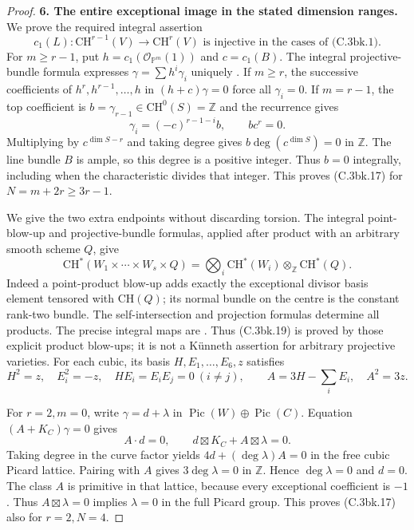 \begin{proof}
\textbf{6. The entire exceptional image in the stated dimension ranges.}
We prove the required integral assertion
\[
 c_1(L):\mathrm{CH}^{r-1}(V)\longrightarrow\mathrm{CH}^r(V)
       \text{ is injective in the cases of (C.3bk.1).}
 \tag{C.3bk.17}
\]
For $m\ge r-1$, put $h=c_1(\mathcal O_{\mathbb P^m}(1))$ and
$c=c_1(B)$. The integral projective-bundle formula expresses
$\gamma=\sum h^i\gamma_i$ uniquely
\citep[Lemma 42.36.2, Tag 02TX]{cyStacksProject}.
If $m\ge r$, the successive coefficients of $h^r,h^{r-1},\ldots,h$
in $(h+c)\gamma=0$ force all $\gamma_i=0$.
If $m=r-1$, the top coefficient is
$b=\gamma_{r-1}\in\mathrm{CH}^0(S)=\mathbb Z$ and the recurrence gives
\[
 \gamma_i=(-c)^{r-1-i}b,\qquad b c^r=0.
 \tag{C.3bk.18}
\]
Multiplying by $c^{\dim S-r}$ and taking degree gives
$b\deg(c^{\dim S})=0$ in $\mathbb Z$. The line bundle $B$ is ample,
so this degree is a positive integer. Thus $b=0$ integrally,
including when the characteristic divides that integer.
This proves (C.3bk.17) for $N=m+2r\ge3r-1$.

We give the two extra endpoints without discarding torsion.
The integral point-blow-up and projective-bundle formulas, applied
after product with an arbitrary smooth scheme $Q$, give
\[
 \mathrm{CH}^*(W_1\times\cdots\times W_s\times Q)
   =\bigotimes_i\mathrm{CH}^*(W_i)\otimes_{\mathbb Z}\mathrm{CH}^*(Q).
 \tag{C.3bk.19}
\]
Indeed a point-product blow-up adds exactly the exceptional divisor
basis element tensored with $\mathrm{CH}(Q)$; its normal bundle
on the centre is the constant rank-two bundle. The self-intersection
and projection formulas determine all products. The precise integral
maps are \citet[Theorems 2.4 and 2.8(3)]{cyJiang2023}.
Thus (C.3bk.19) is proved by those explicit product blow-ups; it is
not a K\"unneth assertion for arbitrary projective varieties.
For each cubic, its basis $H,E_1,\ldots,E_6,z$ satisfies
\[
 H^2=z,\quad E_i^2=-z,\quad HE_i=E_iE_j=0\ (i\ne j),
 \qquad A=3H-\sum_iE_i,\quad A^2=3z.
 \tag{C.3bk.20}
\]

For $r=2,m=0$, write $\gamma=d+\lambda$ in
$\operatorname{Pic}(W)\oplus\operatorname{Pic}(C)$.
Equation $(A+K_C)\gamma=0$ gives
\[
 A\cdot d=0,\qquad d\boxtimes K_C+A\boxtimes\lambda=0.
\]
Taking degree in the curve factor yields
$4d+(\deg\lambda)A=0$ in the free cubic Picard lattice.
Pairing with $A$ gives $3\deg\lambda=0$ in $\mathbb Z$.
Hence $\deg\lambda=0$ and $d=0$. The class $A$ is primitive in
that lattice, because every exceptional coefficient is $-1$.
Thus $A\boxtimes\lambda=0$ implies $\lambda=0$ in the full
Picard group. This proves (C.3bk.17) also for $r=2,N=4$.


\end{proof}
